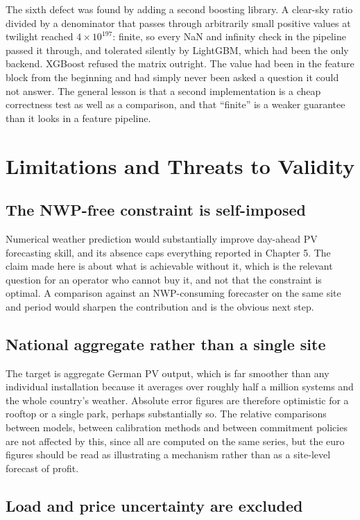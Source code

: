 \documentclass[11pt,a4paper,oneside]{report}
\begin{document}
The sixth defect was found by adding a second boosting library. A clear-sky ratio divided by a denominator that passes through arbitrarily small positive values at twilight reached $4\times10^{197}$: finite, so every NaN and infinity check in the pipeline passed it through, and tolerated silently by LightGBM, which had been the only backend. XGBoost refused the matrix outright. The value had been in the feature block from the beginning and had simply never been asked a question it could not answer. The general lesson is that a second implementation is a cheap correctness test as well as a comparison, and that ``finite'' is a weaker guarantee than it looks in a feature pipeline.


\chapter{Limitations and Threats to Validity}

\section{The NWP-free constraint is self-imposed}

Numerical weather prediction would substantially improve day-ahead PV forecasting skill, and its absence caps everything reported in Chapter 5. The claim made here is about what is achievable without it, which is the relevant question for an operator who cannot buy it, and not that the constraint is optimal. A comparison against an NWP-consuming forecaster on the same site and period would sharpen the contribution and is the obvious next step.

\section{National aggregate rather than a single site}

The target is aggregate German PV output, which is far smoother than any individual installation because it averages over roughly half a million systems and the whole country's weather. Absolute error figures are therefore optimistic for a rooftop or a single park, perhaps substantially so. The relative comparisons between models, between calibration methods and between commitment policies are not affected by this, since all are computed on the same series, but the euro figures should be read as illustrating a mechanism rather than as a site-level forecast of profit.

\section{Load and price uncertainty are excluded}
\end{document}
